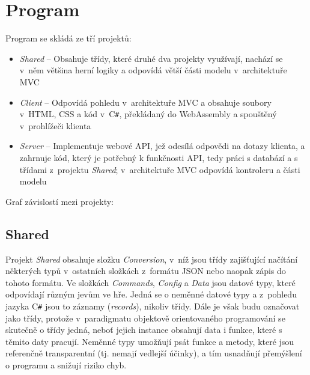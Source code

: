 \documentclass[a4paper,12pt]{article}
\def\CS{C\texttt{\#}}
\begin{document}
\section{Program}
Program se skládá ze tří projektů:
\begin{itemize}
\item\textit{Shared} -- Obsahuje třídy, které druhé dva projekty využívají, nachází se v~něm většina herní logiky a odpovídá větší části modelu v~architektuře MVC\cite{mvc}
\item\textit{Client} -- Odpovídá pohledu v~architektuře MVC a obsahuje soubory v~HTML, CSS a kód v~\CS{}, překládaný do WebAssembly a spouštěný v~prohlížeči klienta
\item\textit{Server} -- Implementuje webové API, jež odesílá odpovědi na dotazy klienta, a zahrnuje kód, který je potřebný k funkčnosti API, tedy práci s databází a s třídami z~projektu \textit{Shared}; v~architektuře MVC odpovídá kontroleru a části modelu
\end{itemize}

Graf závislostí mezi projekty:


\subsection{Shared}
Projekt \textit{Shared} obsahuje složku \textit{Conversion}, v~níž jsou třídy zajišťující načítání některých typů v~ostatních složkách z~formátu JSON nebo naopak zápis do tohoto formátu. Ve složkách \textit{Commands}, \textit{Config} a \textit{Data} jsou datové typy, které odpovídají různým jevům ve hře. Jedná se o neměnné datové typy a z~pohledu jazyka \CS{} jsou to záznamy (\textit{records}), nikoliv třídy. Dále je však budu označovat jako třídy, protože v~paradigmatu objektově orientovaného programování se skutečně o třídy jedná, neboť jejich instance obsahují data i funkce, které s těmito daty pracují.\cite{oop} Neměnné typy umožňují psát funkce a metody, které jsou referenčně transparentní (tj. nemají vedlejší účinky), a tím usnadňují přemýšlení o programu a snižují riziko chyb. \cite{immutable1}\cite{immutable2}
\end{document}
